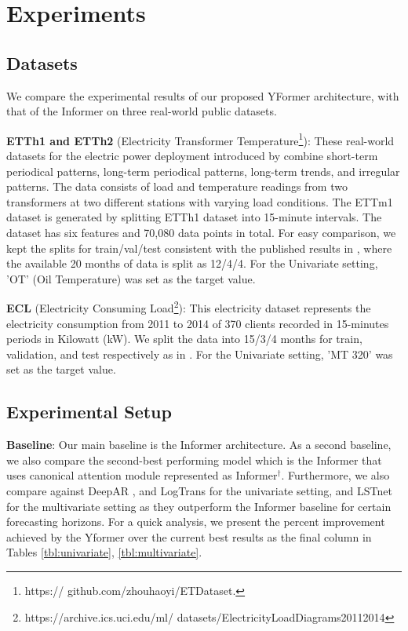 \section{Experiments}

\subsection{Datasets}
We compare the experimental results of our proposed YFormer architecture, with that of the Informer on three real-world public datasets.

\textbf{ETTh1 and ETTh2} (Electricity Transformer Temperature\footnote{https://
github.com/zhouhaoyi/ETDataset.}):
These real-world datasets for the electric power deployment introduced by \cite{zhou2020informer} combine short-term periodical patterns, long-term periodical patterns, long-term trends, and irregular patterns. The data consists of load and temperature readings from two transformers at two different stations with varying load conditions. The ETTm1 dataset is generated by splitting ETTh1 dataset into 15-minute intervals. The dataset has six features and 70,080 data points in total. For easy comparison, we kept the splits for train/val/test consistent with the published results in \cite{zhou2020informer}, where the available 20 months of data is split as 12/4/4. For the Univariate setting, 'OT' (Oil Temperature) was set as the target value.

\textbf{ECL} (Electricity Consuming Load\footnote{https://archive.ics.uci.edu/ml/
datasets/ElectricityLoadDiagrams20112014}): This electricity dataset represents the electricity consumption from 2011 to 2014 of 370 clients recorded in 15-minutes periods in Kilowatt (kW). We split the data into 15/3/4 months for train, validation, and test respectively as in \cite{zhou2020informer}. For the Univariate setting, 'MT 320' was set as the target value.

\subsection{Experimental Setup}
\textbf{Baseline}: Our main baseline is the Informer architecture. As a second baseline, we also compare the second-best performing model which is the Informer that uses canonical attention module \cite{zhou2020informer} represented as Informer$^{\dag}$. Furthermore, we also compare against DeepAR \cite{salinas2020deepar}, and LogTrans \cite{li2019enhancing} for the univariate setting, and LSTnet \cite{lai2018modeling} for the multivariate setting as they outperform the Informer baseline for certain forecasting horizons. For a quick analysis, we present the percent improvement achieved by the Yformer over the current best results as the final column in Tables \ref{tbl:univariate}, \ref{tbl:multivariate}.

